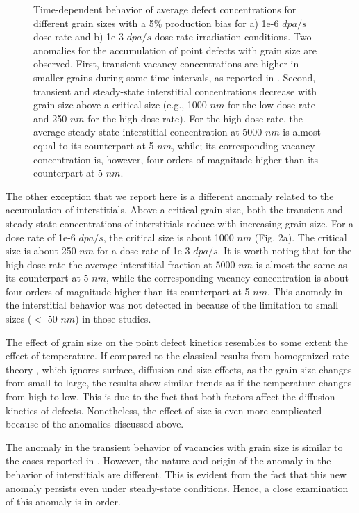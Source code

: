 \documentclass[utf8]{frontiersSCNS} %
\begin{document}
\begin{figure}[h!]
        \caption{Time-dependent behavior of average defect concentrations for different grain sizes with a 5\% production bias for a) 1e-6 $dpa/s$ dose rate and b) 1e-3 $dpa/s$ dose rate irradiation conditions. Two anomalies for the accumulation of point defects with grain size are observed. First, transient vacancy concentrations are higher in smaller grains during some time intervals, as reported in \citep{yang2010}. Second, transient and steady-state interstitial concentrations decrease with grain size above a critical size (e.g., 1000 $nm$ for the low dose rate and 250 $nm$ for the high dose rate). For the high dose rate, the average steady-state interstitial concentration at 5000 $nm$ is almost equal to its counterpart at 5 $nm$, while; its corresponding vacancy concentration is, however, four orders of magnitude higher than its counterpart at 5 $nm$.}
        \label{figure:average_concentrations_neutron_5}
    \end{figure}
    
    The other exception that we report here is a different anomaly related to the accumulation of interstitials. Above a critical grain size, both the transient and steady-state concentrations of interstitials reduce with increasing grain size. For a dose rate of 1e-6 $dpa/s$, the critical size is about 1000 $nm$ (Fig. 2a). The critical size is about 250 $nm$ for a dose rate of 1e-3 $dpa/s$. It is worth noting that for the high dose rate the average interstitial fraction at 5000 $nm$ is almost the same as its counterpart at 5 $nm$, while the corresponding vacancy concentration is about four orders of magnitude higher than its counterpart at 5 $nm$. This anomaly in the interstitial behavior was not detected in \citep{yang2010,demkowicz2011} because of the limitation to small sizes ($<$ 50 $nm$) in those studies.
    
    The effect of grain size on the point defect kinetics resembles to some extent the effect of temperature. If compared to the classical results from homogenized rate-theory \citep{was2017}, which ignores surface, diffusion and size effects, as the grain size changes from small to large, the results show similar trends as if the temperature changes from high to low. This is due to the fact that both factors affect the diffusion kinetics of defects. Nonetheless, the effect of size is even more complicated because of the anomalies discussed above.
    
    The anomaly in the transient behavior of vacancies with grain size is similar to the cases reported in \citep{yang2010}. However, the nature and origin of the anomaly in the behavior of interstitials are different. This is evident from the fact that this new anomaly persists even under steady-state conditions. Hence, a close examination of this anomaly is in order.
    
\end{document}
